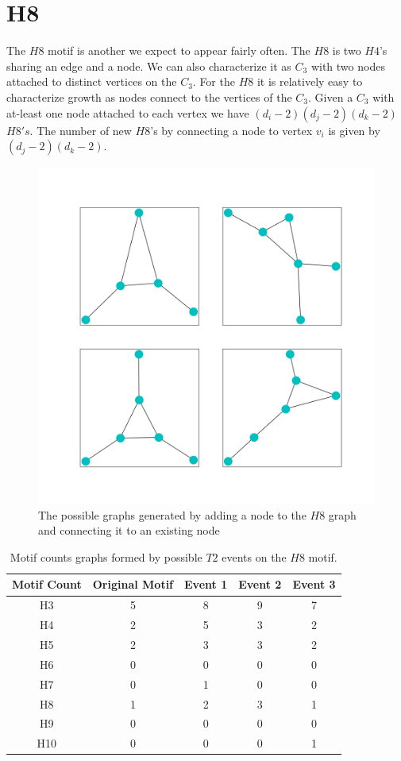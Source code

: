 \section{H8}
The $H8$ motif is another we expect to appear fairly often. The $H8$
is two $H4$'s sharing an edge and a node. We can also characterize
it as $C_3$ with two nodes attached to distinct vertices on the $C_3$. For the 
$H8$ it is relatively easy to characterize growth as nodes connect
to the vertices of the $C_3$. Given a $C_3$ with at-least one node attached
to each vertex we have $(d_i-2)(d_j-2)(d_k-2)$ $H8's$. The number of new 
$H8$'s by connecting a node to vertex $v_i$ is given by $(d_j-2)(d_k-2)$.

\begin{figure}[!ht]
    \includegraphics[width=12cm]{Images/H8_evolution.png}
    \centering
    \caption{The possible graphs generated by adding a node to the $H8$ graph 
    and connecting it to an existing node}
\end{figure}

\FloatBarrier
\begin{table}
    \centering
    \begin{tabular}{||c c c c c||} 
    \hline
    Motif Count & Original Motif & Event 1 & Event 2 & Event 3 \\ [0.5ex] 
    \hline\hline
    H3 & 5 & 8 & 9 & 7\\ 
    \hline
    H4 & 2 & 5 & 3 & 2 \\
    \hline
    H5 & 2 & 3 & 3 & 2 \\
    \hline
    H6 & 0 & 0 & 0 & 0 \\
    \hline
    H7 & 0 & 1 & 0 & 0 \\
    \hline
    H8 & 1 & 2 & 3 & 1\\
    \hline
    H9 & 0 & 0 & 0 & 0\\
    \hline
    H10 & 0 & 0 & 0 & 1\\
    \hline
   \end{tabular}
   \caption{Motif counts graphs formed by possible $T2$ events on the $H8$ motif.}
   \label{table:6}
\end{table}


